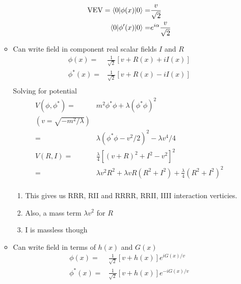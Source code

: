 \begin{itemize}
\begin{itemize}
        \begin{equation}\begin{split}
        \text{VEV}=\braket{0|\phi(x)|0}=&\frac{v}{\sqrt{2}} \\
        \braket{0|\phi'(x)|0}=&e^{i\alpha}\frac{v}{\sqrt{2}} \\
        \end{split}\end{equation}
        \item Can write field in component real scalar fields $I$ and $R$ \cite{wells}
        \begin{equation}\begin{split}
        \phi(x)=&\frac{1}{\sqrt{2}}[v+R(x)+iI(x)] \\
        \phi^*(x)=&\frac{1}{\sqrt{2}}[v+R(x)-iI(x)] \\
        \end{split}\end{equation}
        Solving for potential
        \begin{equation}\begin{split}
        V(\phi,\phi^*)=&m^2\phi^*\phi+\lambda(\phi^*\phi)^2 \\
        (v=\sqrt{-m^2/\lambda}) \\
                      =&\lambda(\phi^*\phi-v^2/2)^2-\lambda v^4/4 \\
        V(R,I)=&\frac{\lambda}{4}[(v+R)^2+I^2-v^2]^2 \\
        =&\lambda v^2R^2+\lambda vR(R^2+I^2)+\frac{\lambda}{4}(R^2+I^2)^2 \\
        \end{split}\end{equation}
        \begin{enumerate}\scriptsize
            \item This gives us RRR, RII and RRRR, RRII, IIII interaction verticies. \cite{wells}
            \item Also, a mass term $\lambda v^2$ for $R$ \cite{wells}
            \item I is massless though \cite{wells}
        \end{enumerate}
        \item Can write field in terms of $h(x)$ and $G(x)$ \cite{wells}
        \begin{equation}\begin{split}
        \phi(x)=&\frac{1}{\sqrt{2}}[v+h(x)]e^{iG(x)/v} \\
        \phi^*(x)=&\frac{1}{\sqrt{2}}[v+h(x)]e^{-iG(x)/v} \\

\end{split}
\end{equation}
\end{itemize}
\end{itemize}
